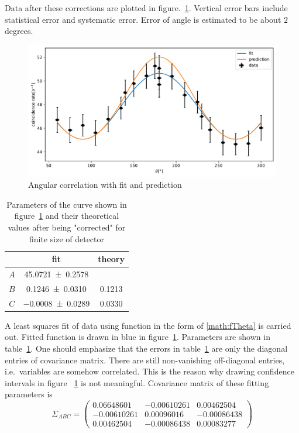Data after these corrections are plotted in figure.~\ref{fig:angCor}. Vertical error bars include statistical error and systematic error. Error of angle is estimated to be about $2$ degrees.
\begin{figure}[ht]
   \centering
   \includegraphics[width=0.8\linewidth]{./figs/angCor.pdf}
   \caption{Angular correlation with fit and prediction}%
   \label{fig:angCor}
\end{figure}

\begin{table}[ht]
   \centering
   \begin{tabular}{ccc}
      \toprule
   & fit & theory \\
      \midrule
      $A$ &\num{45.0721 +- 0.2578} &   \\
      $B$ & \num{0.1246 +- 0.0310} & \num{0.1213}\\
      $C$ &\num{-0.0008 +- 0.0289} & \num{0.0330}\\
      \bottomrule
   \end{tabular}
   \caption{Parameters of the curve shown in figure~\ref{fig:angCor} and their theoretical values after being "corrected" for finite size of detector}
   \label{tab:ABC}
\end{table}

A least squares fit of data using function in the form of \eqref{math:fTheta} is carried out. Fitted function is drawn in blue in figure~\ref{fig:angCor}. Parameters are shown in table~\ref{tab:ABC}. One should emphasize that the errors in table~\ref{tab:ABC} are only the diagonal entries of covariance matrix. There are still non-vanishing off-diagonal entries, i.e.~variables are somehow correlated. This is the reason why drawing confidence intervals in figure ~\ref{fig:angCor} is not meaningful. Covariance matrix of these fitting parameters is
\begin{equation}
   \Sigma_{ABC} = \begin{pmatrix} \num{0.06648601} & \num{-0.00610261} & \num{0.00462504} \\
   \num{-0.00610261} & \num{0.00096016} & \num{-0.00086438} \\
\num{0.00462504} & \num{-0.00086438} & \num{0.00083277}\end{pmatrix}
\label{math:Sigma}
\end{equation}

